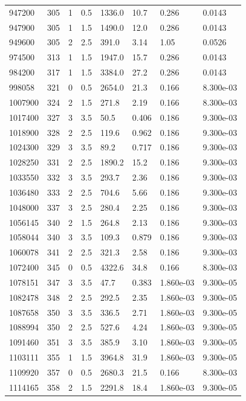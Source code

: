\documentclass[preview]{standalone}
\begin{document}
{{{\begin{tabular}{L{1.2cm}C{1.2cm} C{0.3cm}C{0.5cm} C{1.4cm}C{1.4cm} C{1.4cm}C{1.4cm}}
  947200  &   305  & 1     & 0.5 &  1336.0  & 10.7  & 0.286 &  0.0143   \\ 
  947900  &   305  & 1     & 1.5 &  1490.0  & 12.0  & 0.286 &  0.0143   \\ 
  949600  &   305  & 2     & 2.5 &  391.0  & 3.14  & 1.05 &  0.0526   \\ 
  974500  &   313  & 1     & 1.5 &  1947.0  & 15.7  & 0.286 &  0.0143   \\ 
  984200  &   317  & 1     & 1.5 &  3384.0  & 27.2  & 0.286 &  0.0143   \\ 
  998058  &   321  & 0     & 0.5 &  2654.0  & 21.3  & 0.166 &  8.300e-03   \\ 
  1007900  &   324  & 2     & 1.5 &  271.8  & 2.19  & 0.166 &  8.300e-03   \\ 
  1017400  &   327  & 3     & 3.5 &  50.5  & 0.406  & 0.186 &  9.300e-03   \\ 
  1018900  &   328  & 2     & 2.5 &  119.6  & 0.962  & 0.186 &  9.300e-03   \\ 
  1024300  &   329  & 3     & 3.5 &  89.2  & 0.717  & 0.186 &  9.300e-03   \\ 
  1028250  &   331  & 2     & 2.5 &  1890.2  & 15.2  & 0.186 &  9.300e-03   \\ 
  1033550  &   332  & 3     & 3.5 &  293.7  & 2.36  & 0.186 &  9.300e-03   \\ 
  1036480  &   333  & 2     & 2.5 &  704.6  & 5.66  & 0.186 &  9.300e-03   \\ 
  1048000  &   337  & 3     & 2.5 &  280.4  & 2.25  & 0.186 &  9.300e-03   \\ 
  1056145  &   340  & 2     & 1.5 &  264.8  & 2.13  & 0.186 &  9.300e-03   \\ 
  1058044  &   340  & 3     & 3.5 &  109.3  & 0.879  & 0.186 &  9.300e-03   \\ 
  1060078  &   341  & 2     & 2.5 &  321.3  & 2.58  & 0.186 &  9.300e-03   \\ 
  1072400  &   345  & 0     & 0.5 &  4322.6  & 34.8  & 0.166 &  8.300e-03   \\ 
  1078151  &   347  & 3     & 3.5 &  47.7  & 0.383  & 1.860e-03 &  9.300e-05   \\ 
  1082478  &   348  & 2     & 2.5 &  292.5  & 2.35  & 1.860e-03 &  9.300e-05   \\ 
  1087658  &   350  & 3     & 3.5 &  336.5  & 2.71  & 1.860e-03 &  9.300e-05   \\ 
  1088994  &   350  & 2     & 2.5 &  527.6  & 4.24  & 1.860e-03 &  9.300e-05   \\ 
  1091460  &   351  & 3     & 3.5 &  385.9  & 3.10  & 1.860e-03 &  9.300e-05   \\ 
  1103111  &   355  & 1     & 1.5 &  3964.8  & 31.9  & 1.860e-03 &  9.300e-05   \\ 
  1109920  &   357  & 0     & 0.5 &  2680.3  & 21.5  & 0.166 &  8.300e-03   \\ 
  1114165  &   358  & 2     & 1.5 &  2291.8  & 18.4  & 1.860e-03 &  9.300e-05   \\ 
\hline 
\end{tabular} 

}}}
\end{document}
